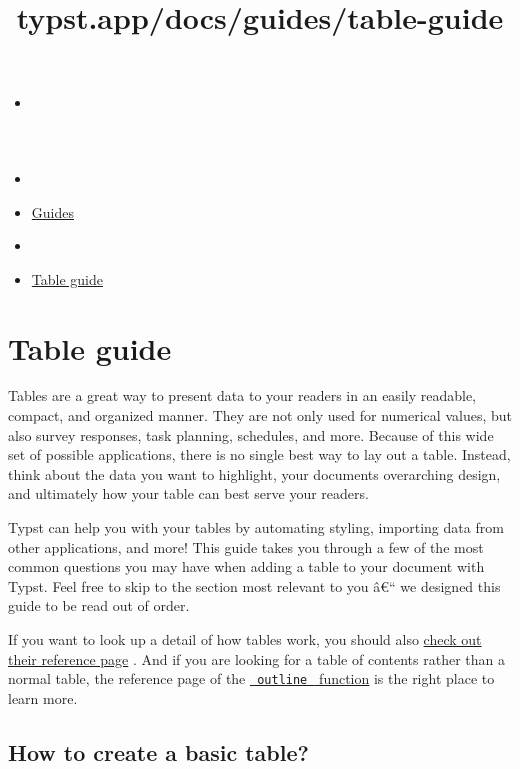 \title{typst.app/docs/guides/table-guide}

\begin{itemize}
\tightlist
\item
  \href{/docs}{}
\item
  
\item
  \href{/docs/guides/}{Guides}
\item
  
\item
  \href{/docs/guides/table-guide/}{Table guide}
\end{itemize}

\section{Table guide}\label{table-guide}

Tables are a great way to present data to your readers in an easily
readable, compact, and organized manner. They are not only used for
numerical values, but also survey responses, task planning, schedules,
and more. Because of this wide set of possible applications, there is no
single best way to lay out a table. Instead, think about the data you
want to highlight, your document\textquotesingle s overarching design,
and ultimately how your table can best serve your readers.

Typst can help you with your tables by automating styling, importing
data from other applications, and more! This guide takes you through a
few of the most common questions you may have when adding a table to
your document with Typst. Feel free to skip to the section most relevant
to you â€`` we designed this guide to be read out of order.

If you want to look up a detail of how tables work, you should also
\href{/docs/reference/model/table/}{check out their reference page} .
And if you are looking for a table of contents rather than a normal
table, the reference page of the
\href{/docs/reference/model/outline/}{\texttt{\ outline\ } function} is
the right place to learn more.

\subsection{How to create a basic table?}\label{basic-tables}

